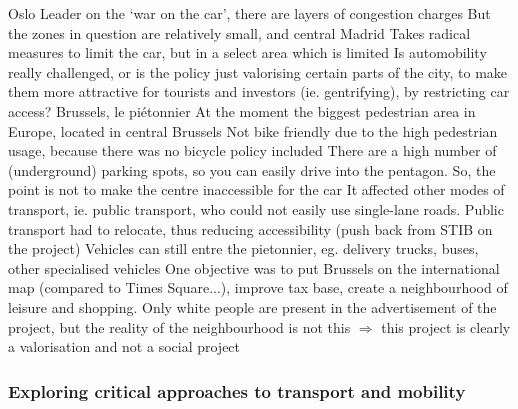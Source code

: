 \documentclass{article}
\begin{document}
\begin{outline}
	\1 Oslo
		\2 Leader on the `war on the car', there are layers of congestion charges
		\2 But the zones in question are relatively small, and central
	\1 Madrid
		\2 Takes radical measures to limit the car, but in a select area which is limited
		\2 Is automobility really challenged, or is the policy just valorising certain parts of the city, to make them more attractive for tourists and investors (ie. gentrifying), by restricting car access?
	\1 Brussels, le piétonnier
		\2 At the moment the biggest pedestrian area in Europe, located in central Brussels
		\2 Not bike friendly due to the high pedestrian usage, because there was no bicycle policy included
		\2 There are a high number of (underground) parking spots, so you can easily drive into the pentagon. So, the point is not to make the centre inaccessible for the car
		\2 It affected other modes of transport, ie. public transport, who could not easily use single-lane roads. Public transport had to relocate, thus reducing accessibility (push back from STIB on the project)
		\2 Vehicles can still entre the pietonnier, eg. delivery trucks, buses, other specialised vehicles
		\2 One objective was to put Brussels on the international map (compared to Times Square...), improve tax base, create a neighbourhood of leisure and shopping. Only white people are present in the advertisement of the project, but the reality of the neighbourhood is not this
		\2 $\Rightarrow$ this project is clearly a valorisation and not a social project
\end{outline}

\subsubsection{Exploring critical approaches to transport and mobility}
\end{document}
